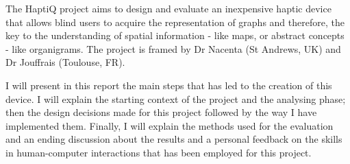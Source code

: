 The HaptiQ project aims to design and evaluate an inexpensive haptic
device that allows blind users to acquire the representation of graphs
and therefore, the key to the understanding of spatial information -
like maps, or abstract concepts - like organigrams. The project is
framed by Dr Nacenta (St Andrews, UK) and Dr Jouffrais (Toulouse, FR).

I will present in this report the main steps that has led to the
creation of this device. I will explain the starting context of the
project and the analysing phase; then the design decisions made for this
project followed by the way I have implemented them. Finally, I will
explain the methods used for the evaluation and an ending discussion
about the results and a personal feedback on the skills in
human-computer interactions that has been employed for this project.